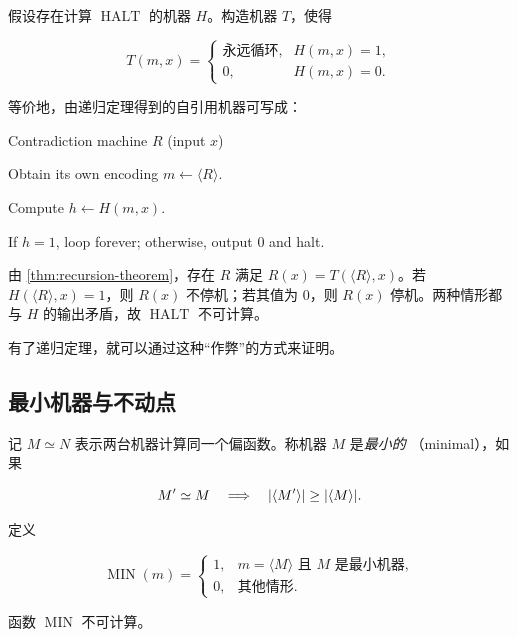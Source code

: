 \begin{example}[用递归定理重证停机问题]
  \label{ex:halting-via-recursion-theorem}
  假设存在计算 $\operatorname{HALT}$ 的机器 $H$。构造机器 $T$，使得

  \[
    T(m,x)=
    \begin{cases}
      \text{永远循环},&H(m,x)=1,\\
      0,&H(m,x)=0.
    \end{cases}
  \]

  等价地，由递归定理得到的自引用机器可写成：

  \begin{pseudocode}{Contradiction machine $R$ (input $x$)}
    \item Obtain its own encoding $m\gets\langle R\rangle$.
    \item Compute $h\gets H(m,x)$.
    \item If $h=1$, loop forever; otherwise, output $0$ and halt.
  \end{pseudocode}

  由 \cref{thm:recursion-theorem}，存在 $R$ 满足
  $R(x)=T(\langle R\rangle,x)$。若 $H(\langle R\rangle,x)=1$，则 $R(x)$
  不停机；若其值为 $0$，则 $R(x)$ 停机。两种情形都与 $H$ 的输出矛盾，故
  $\operatorname{HALT}$ 不可计算。
\end{example}

有了递归定理，就可以通过这种“作弊”的方式来证明。

\subsection{最小机器与不动点}

记 $M\simeq N$ 表示两台机器计算同一个偏函数。称机器 $M$ 是\emph{最小的}
（minimal），如果

\[
  M'\simeq M
  \quad\Longrightarrow\quad
  \lvert \langle M'\rangle\rvert\geq\lvert \langle M\rangle\rvert.
\]

定义

\[
  \operatorname{MIN}(m)=
  \begin{cases}
    1,&m=\langle M\rangle\text{ 且 }M\text{ 是最小机器},\\
    0,&\text{其他情形}.
  \end{cases}
\]

\begin{example}[识别最小机器]
  \label{ex:minimal-tm-uncomputable}
  函数 $\operatorname{MIN}$ 不可计算。
\end{example}


